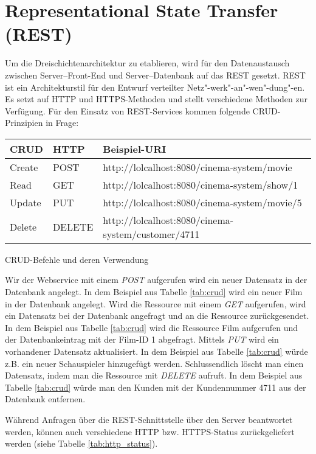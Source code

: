 \section{Representational State Transfer (REST)}
\label{sec:rest}
Um die Dreischichtenarchitektur zu etablieren, wird für den Datenaustausch zwischen Server--Front-End und Server--Datenbank auf das \acf{REST} gesetzt.
\acs{REST} ist ein Architekturstil für den Entwurf verteilter Netz"-werk"-an"-wen"-dung"-en.
Es setzt auf \acs{HTTP} und \acs{HTTPS}-Methoden und stellt verschiedene Methoden zur Verfügung.
Für den Einsatz von \acs{REST}-Services kommen folgende \acs{CRUD}-Prinzipien in Frage:

\setlength{\tabcolsep}{6pt}
\begin{tabular}{l|l|l}
	\acs{CRUD} & \acs{HTTP} & Beispiel-\acs{URI} \\
	\hline
	Create & POST & http://lolcalhost:8080/cinema-system/movie \\
	Read & GET & http://lolcalhost:8080/cinema-system/show/1 \\
	Update & PUT & http://lolcalhost:8080/cinema-system/movie/5 \\
	Delete & DELETE & http://lolcalhost:8080/cinema-system/customer/4711 \\
\end{tabular}
\caption{\acs{CRUD}-Befehle und deren Verwendung}
\label{tab:crud}

Wir der Webservice mit einem \textit{POST} aufgerufen wird ein neuer Datensatz in der Datenbank angelegt.
In dem Beispiel aus Tabelle \vref{tab:crud} wird ein neuer Film in der Datenbank angelegt.
Wird die Ressource mit einem \textit{GET} aufgerufen, wird ein Datensatz bei der Datenbank angefragt und an die Ressource zurückgesendet.
In dem Beispiel aus Tabelle \vref{tab:crud} wird die Ressource Film aufgerufen und der Datenbankeintrag mit der Film-ID 1 abgefragt.
Mittels \textit{PUT} wird ein vorhandener Datensatz aktualisiert.
In dem Beispiel aus Tabelle \vref{tab:crud} würde z.B. ein neuer Schauspieler hinzugefügt werden.
Schlussendlich löscht man einen Datensatz, indem man die Ressource mit \textit{DELETE} aufruft.
In dem Beispiel aus Tabelle \vref{tab:crud} würde man den Kunden mit der Kundennummer 4711 aus der Datenbank entfernen.

Während Anfragen über die \acs{REST}-Schnittstelle über den Server beantwortet werden, können auch verschiedene \acs{HTTP} bzw. \acs{HTTPS}-Status zurückgeliefert werden (siehe Tabelle \vref{tab:http_status}).

